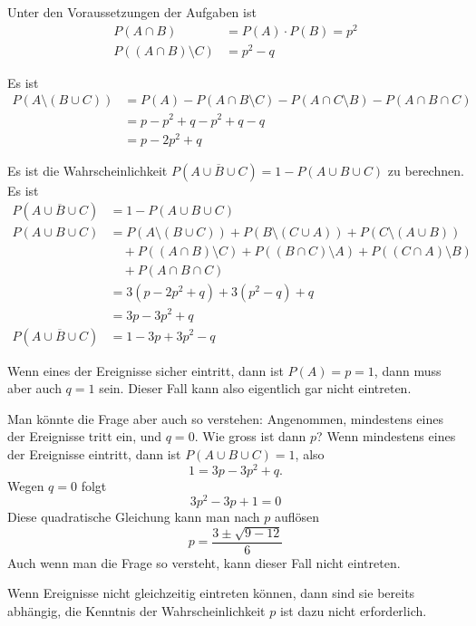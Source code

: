 \begin{loesung}
Unter den Voraussetzungen der Aufgaben ist
\begin{align*}
P(A\cap B)&=P(A)\cdot P(B) = p^2\\
P((A\cap B)\setminus C)&=p^2-q
\end{align*}
\begin{teilaufgaben}
\item Es ist
\begin{align*}
P(A\setminus (B\cup C))
&=
P(A) - P(A\cap B\setminus C) - P(A\cap C\setminus B)-P(A\cap B\cap C)
\\
&=p-p^2+q-p^2+q-q
\\
&=p-2p^2+q
\end{align*}
\item
Es ist die Wahrscheinlichkeit $P(\overline{A\cup B\cup C}) = 1-P(A\cup B\cup C)$ zu berechnen.
Es ist
\begin{align*}
P(\overline{A\cup B\cup C})
&=
1-P(A\cup B \cup C)\\
P(A\cup B \cup C)
&=
P(A\setminus(B\cup C))
+P(B\setminus(C\cup A))
+P(C\setminus(A\cup B))
\\
&\quad
+P((A\cap B)\setminus C)
+P((B\cap C)\setminus A)
+P((C\cap A)\setminus B)
\\
&\quad
+P(A\cap B\cap C)
\\
&=3(p-2p^2+q)+3(p^2-q)+q
\\
&=3p-3p^2+q
\\
P(\overline{A\cup B\cup C})
&=
1-3p+3p^2-q
\end{align*}
\item
Wenn eines der Ereignisse sicher eintritt, dann ist $P(A)=p=1$, dann muss
aber auch $q=1$ sein. Dieser Fall kann also eigentlich gar nicht
eintreten.

Man könnte die Frage aber auch so verstehen: Angenommen, mindestens
eines der Ereignisse tritt ein, und $q=0$. Wie gross ist dann $p$?
Wenn mindestens eines der Ereignisse eintritt, dann ist
$P(A\cup B\cup C)=1$, also
\[
1=3p-3p^2+q.
\]
Wegen $q=0$ folgt
\[
3p^2-3p+1=0
\]
Diese quadratische Gleichung kann man nach $p$ auflösen
\[
p=\frac{3\pm\sqrt{9-12}}{6}
\]
Auch wenn man die Frage so versteht, kann dieser Fall nicht eintreten.
\item
Wenn Ereignisse nicht gleichzeitig eintreten können, dann sind
sie bereits abhängig, die Kenntnis der Wahrscheinlichkeit $p$
ist dazu nicht erforderlich.
\qedhere
\end{teilaufgaben}
\end{loesung}

